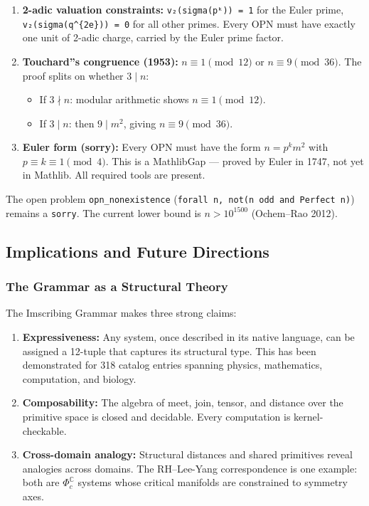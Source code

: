 \documentclass[12pt,a4paper]{article}
\begin{document}
\begin{enumerate}
    \item \textbf{2-adic valuation constraints:} \texttt{v₂(sigma(pᵏ)) = 1} for the Euler prime, \texttt{v₂(sigma(q\^{}\{2e\})) = 0} for all other primes. Every OPN must have exactly one unit of 2-adic charge, carried by the Euler prime factor.
    \item 
    \textbf{Touchard''s congruence (1953):} $n \equiv 1 \pmod{12}$ or $n \equiv 9 \pmod{36}$. The proof splits on whether $3 \mid n$:

    \begin{itemize}
    \item If $3 \nmid n$: modular arithmetic shows $n \equiv 1 \pmod{12}$.
    \item If $3 \mid n$: then $9 \mid m^2$, giving $n \equiv 9 \pmod{36}$.
\end{itemize}

    \item \textbf{Euler form (sorry):} Every OPN must have the form $n = p^k m^2$ with $p \equiv k \equiv 1 \pmod{4}$. This is a MathlibGap --- proved by Euler in 1747, not yet in Mathlib. All required tools are present.
\end{enumerate}

The open problem \texttt{opn\_nonexistence} (\texttt{forall n, not(n odd and Perfect n)}) remains a \texttt{sorry}. The current lower bound is $n > 10^{1500}$ (Ochem--Rao 2012).

\subsection{Implications and Future Directions}

\subsubsection{The Grammar as a Structural Theory}

The Imscribing Grammar makes three strong claims:

\begin{enumerate}
    \item \textbf{Expressiveness:} Any system, once described in its native language, can be assigned a 12-tuple that captures its structural type. This has been demonstrated for 318 catalog entries spanning physics, mathematics, computation, and biology.
    \item \textbf{Composability:} The algebra of meet, join, tensor, and distance over the primitive space is closed and decidable. Every computation is kernel-checkable.
    \item \textbf{Cross-domain analogy:} Structural distances and shared primitives reveal analogies across domains. The RH--Lee-Yang correspondence is one example: both are $\Phi_c^\mathbb{C}$ systems whose critical manifolds are constrained to symmetry axes.
\end{enumerate}
\end{document}
